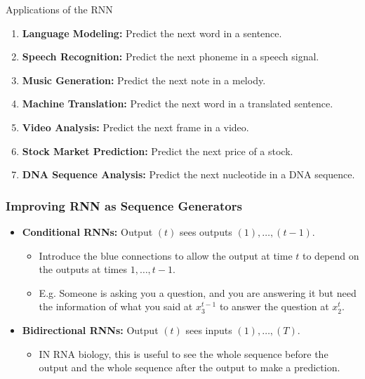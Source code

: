 \begin{example}
    Applications of the RNN 
    \begin{enumerate}
        \item \textbf{Language Modeling:} Predict the next word in a sentence.
        \item \textbf{Speech Recognition:} Predict the next phoneme in a speech signal.
        \item \textbf{Music Generation:} Predict the next note in a melody.
        \item \textbf{Machine Translation:} Predict the next word in a translated sentence.
        \item \textbf{Video Analysis:} Predict the next frame in a video.
        \item \textbf{Stock Market Prediction:} Predict the next price of a stock.
        \item \textbf{DNA Sequence Analysis:} Predict the next nucleotide in a DNA sequence.
    \end{enumerate}
\end{example}

\subsubsection{Improving RNN as Sequence Generators}
\begin{summary}
    \begin{itemize}
        \item \textbf{Conditional RNNs:} Output $(t)$ sees outputs $(1), \ldots, (t-1)$.
        \begin{itemize}
            \item Introduce the blue connections to allow the output at time \( t \) to depend on the outputs at times \( 1, \ldots, t-1 \).
            \item E.g. Someone is asking you a question, and you are answering it but need the information of what you said at $x_3^{t-1}$ to answer the question at $x_2^t$.
        \end{itemize}
        \item \textbf{Bidirectional RNNs:} Output $(t)$ sees inputs $(1), \ldots, (T)$.
        \begin{itemize}
            \item IN RNA biology, this is useful to see the whole sequence before the output and the whole sequence after the output to make a prediction.
        \end{itemize}
    \end{itemize}
\end{summary}

